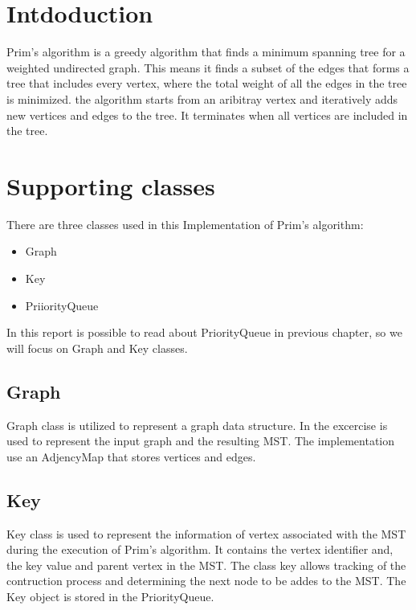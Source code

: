 \section{Intdoduction}
Prim's algorithm is a greedy algorithm that finds a minimum spanning tree for a weighted undirected graph. This means it finds a subset of the edges that forms a tree that includes every vertex, where the total weight of all the edges in the tree is minimized. 
the algorithm starts from an aribitray vertex and iteratively adds new vertices and edges to the tree. It terminates when all vertices are included in the tree.

\section{Supporting classes}
There are three classes used in this Implementation of Prim's algorithm:
\begin{itemize}
  \item Graph
  \item Key
  \item PriiorityQueue
\end{itemize}

In this report is possible to read about PriorityQueue in previous chapter, so we will focus on Graph and Key classes.

\subsection{Graph}
Graph class is utilized to represent a graph data structure. In the excercise is used to represent the input graph and the resulting MST.
The implementation use an AdjencyMap that stores vertices and edges.

\subsection{Key}
Key class is used to represent the information of vertex associated with the MST during the execution of Prim's algorithm. It contains the vertex identifier and, the key value and parent vertex in the MST. The class key allows tracking of the contruction process and determining the next node to be addes to the MST.
The Key object is stored in the PriorityQueue.

